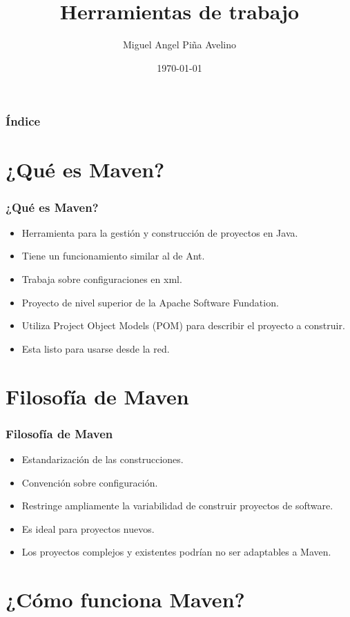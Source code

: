 \documentclass{beamer}
\title[Laboratorio]{Herramientas de trabajo}
\author[Miguel]{Miguel Angel Piña Avelino}
\institute[UNAM]{
  Ingeniería de Software,\\
  Facultad de Ciencias, UNAM
}
\date{\today}
\begin{document}
\frame{\titlepage}
\begin{frame}
  \frametitle{Índice}
  \tableofcontents
\end{frame}

\section{¿Qué es Maven?}

\begin{frame}
  \frametitle{¿Qué es Maven?}
  \begin{itemize}[<+->]
  \item Herramienta para la gestión y construcción de proyectos en Java.
  \item Tiene un funcionamiento similar al de Ant.
  \item Trabaja sobre configuraciones en xml.
  \item Proyecto de nivel superior de la Apache Software Fundation.
  \item Utiliza Project Object Models (POM) para describir el proyecto a construir.
  \item Esta listo para usarse desde la red.
  \end{itemize}
\end{frame}

\section{Filosofía de Maven}

\begin{frame}
  \frametitle{Filosofía de Maven}
  \begin{itemize}[<+->]
  \item Estandarización de las construcciones.
  \item Convención sobre configuración.
  \item Restringe ampliamente la variabilidad de construir proyectos de software.
  \item Es ideal para proyectos nuevos.
  \item Los proyectos complejos y existentes podrían no ser adaptables a Maven.
  \end{itemize}
\end{frame}

\section{¿Cómo funciona Maven?}
\end{document}
